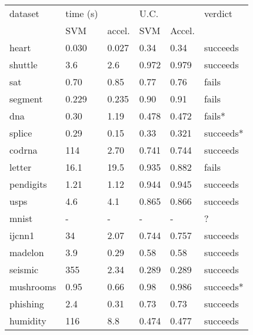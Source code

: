 \begin{tabular}{|l|ll|ll|l|}
	\hline
dataset & time (s) & & U.C. & & verdict \\
 & SVM & accel. & SVM & Accel. & \\
	\hline
heart & 0.030 & 0.027 & 0.34 & 0.34 & succeeds \\
shuttle & 3.6 & 2.6 & 0.972 & 0.979 & succeeds \\
	sat & 0.70 & 0.85 & 0.77 & 0.76 & fails \\
segment & 0.229 & 0.235 & 0.90 & 0.91 & fails \\
	dna & 0.30 & 1.19 & 0.478 & 0.472 & fails* \\
	splice & 0.29 & 0.15 & 0.33 & 0.321 & succeeds* \\
	codrna & 114 & 2.70 & 0.741 & 0.744 & succeeds \\
	letter & 16.1 & 19.5 & 0.935 & 0.882 & fails \\
	pendigits & 1.21 & 1.12 & 0.944 & 0.945 & succeeds \\
	usps & 4.6 & 4.1 & 0.865 & 0.866 & succeeds \\
	mnist & - & - & - & - & ? \\
	ijcnn1 & 34 & 2.07 & 0.744 & 0.757 & succeeds \\
	madelon & 3.9 & 0.29 & 0.58 & 0.58 & succeeds \\
	seismic & 355 & 2.34 & 0.289 & 0.289 & succeeds \\
	mushrooms & 0.95 & 0.66 & 0.98 & 0.986 & succeeds* \\
	phishing & 2.4 & 0.31 & 0.73 & 0.73 & succeeds \\
	humidity & 116 & 8.8 & 0.474 & 0.477 & succeeds \\
	\hline
\end{tabular}
